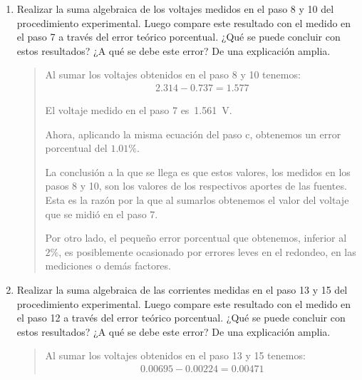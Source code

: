 \documentclass{article}
\begin{document}
    \begin{enumerate}[label=\alph*.-]
        \subsection{Superposición}

        \item Realizar la suma algebraica de los voltajes medidos en el paso 8 y 10 del procedimiento experimental. Luego compare este resultado con el medido en el paso 7 a través del error teórico porcentual. ¿Qué se puede concluir con estos resultados? ¿A qué se debe este error? De una explicación amplia.
        
        \begin{quote}
            Al sumar los voltajes obtenidos en el paso 8 y 10 tenemos:
            \begin{align*}
                2.314 - 0.737 = 1.577
            \end{align*}

            El voltaje medido en el paso 7 es~\SI{1.561}{\volt}.

            Ahora, aplicando la misma ecuación del paso c, obtenemos un error porcentual del $1.01\%$.

            La conclusión a la que se llega es que estos valores, los medidos en los pasos 8 y 10, son los valores de los respectivos aportes de las fuentes. Esta es la razón por la que al sumarlos obtenemos el valor del voltaje que se midió en el paso 7.
            
            Por otro lado, el pequeño error porcentual que obtenemos, inferior al $2\%$, es posiblemente ocasionado por errores leves en el redondeo, en las mediciones o demás factores.
        \end{quote}

        \item Realizar la suma algebraica de las corrientes medidas en el paso 13 y 15 del procedimiento experimental. Luego compare este resultado con el medido en el paso 12 a través del error teórico porcentual. ¿Qué se puede concluir con estos resultados? ¿A qué se debe este error? De una explicación amplia.
        
        \begin{quote}
            Al sumar los voltajes obtenidos en el paso 13 y 15 tenemos:
            \begin{align*}
                0.00695 - 0.00224 = 0.00471
            \end{align*}


\end{quote}
\end{enumerate}
\end{document}
